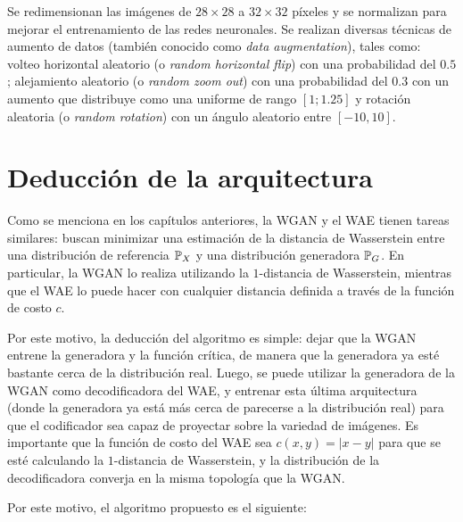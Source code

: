 
Se redimensionan las imágenes de $28\times28$ a $32\times32$ píxeles y se normalizan para mejorar el entrenamiento de las redes neuronales. Se realizan diversas técnicas de aumento de datos (también conocido como \textit{data augmentation}), tales como: volteo horizontal aleatorio (o \textit{random horizontal flip}) con una probabilidad del $0.5$; alejamiento aleatorio (o \textit{random zoom out}) con una probabilidad del $0.3$ con un aumento que distribuye como una uniforme de rango $[1; 1.25]$ y rotación aleatoria (o \textit{random rotation}) con un ángulo aleatorio entre $[-10, 10]$.


\section{Deducción de la arquitectura}\label{sec:deduccion-arquitectura-wae-wgan}  %

Como se menciona en los capítulos anteriores, la WGAN y el WAE tienen tareas similares: buscan minimizar una estimación de la distancia de Wasserstein entre una distribución de referencia $\Prob_X$ y una distribución generadora $\Prob_G$. En particular, la WGAN lo realiza utilizando la $1$-distancia de Wasserstein, mientras que el WAE lo puede hacer con cualquier distancia definida a través de la función de costo $c$.

Por este motivo, la deducción del algoritmo es simple: dejar que la WGAN entrene la generadora y la función crítica, de manera que la generadora ya esté bastante cerca de la distribución real. Luego, se puede utilizar la generadora de la WGAN como decodificadora del WAE, y entrenar esta última arquitectura (donde la generadora ya está más cerca de parecerse a la distribución real) para que el codificador sea capaz de proyectar sobre la variedad de imágenes. Es importante que la función de costo del WAE sea $c(x, y) = |x - y|$ para que se esté calculando la $1$-distancia de Wasserstein, y la distribución de la decodificadora converja en la misma topología que la WGAN.


Por este motivo, el algoritmo propuesto es el siguiente:

